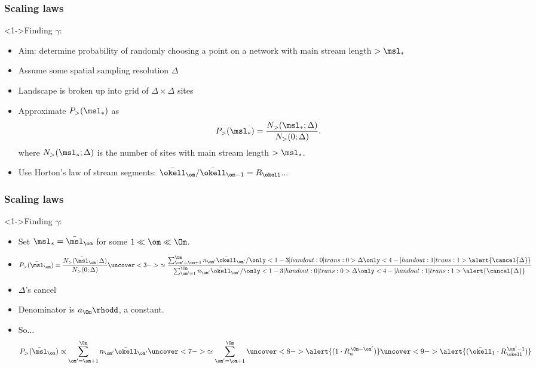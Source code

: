 \begin{frame}[label=]
  \frametitle{Scaling laws}

  \begin{block}<1->{Finding $\gamma$:}
    \begin{itemize}
    \item<1-> \alert{Aim:} determine probability of randomly choosing
      a point on a network with main stream length $> \msl_\ast$
    \item<2-> Assume some spatial sampling resolution $\Delta$
    \item<3-> Landscape is broken up into grid of $\Delta \times \Delta$ sites
    \item<4-> Approximate $P_> (\msl_\ast)$ as 
      $$
      P_> (\msl_\ast)
      =
      \frac
      {N_> (\msl_\ast; \Delta)}
      {N_> (0; \Delta)}.
      $$
      where $N_> (\msl_\ast; \Delta)$ is the number of sites
      with main stream length $> \msl_\ast$.
    \item<5-> Use Horton's law of stream segments: $\bar{\okell}_\om/\bar{\okell}_{\om-1} = R_\okell$...
    \end{itemize}
  \end{block}

\end{frame}

\begin{frame}[label=]
  \frametitle{Scaling laws}

  \begin{block}<1->{Finding $\gamma$:}
    \begin{itemize}
    \item<1-> Set $\msl_\ast = \bar{\msl}_\om$ for some $1 \ll \om \ll \Om$.
    \item<2->
      $$
      P_> (\bar{\msl}_\om)
      =
      \frac
      {N_> (\bar{\msl}_\om; \Delta)}
      {N_> (0; \Delta)}
      \uncover<3->{
        \simeq
        \frac
        {
          \sum_{\om'=\om+1}^{\Om} n_{\om'}
          \bar{\okell}_{\om'}/\only<1-3 | handout:0 | trans:0>{\Delta}\only<4- | handout:1 | trans:1>{\alert{\cancel{\Delta}}}
        }
        {
          \sum_{\om'=1}^{\Om} n_{\om'} \bar{\okell}_{\om'}/\only<1-3 | handout:0 | trans:0>{\Delta}\only<4- | handout:1 | trans:1>{\alert{\cancel{\Delta}}}
        }
      }
      $$
    \item<4->
      $\Delta$'s cancel
    \item<5-> 
      Denominator is $a_\Om \rhodd$, a constant.
    \item<6->
      So...  
      $$
      P_> (\bar{\msl}_\om)
      \propto
      \sum_{\om'=\om+1}^{\Om} n_{\om'} \bar{\okell}_{\om'}
      \uncover<7->{
        \simeq
        \sum_{\om'=\om+1}^{\Om} 
        \uncover<8->{\alert{(1\cdot R_n^{\, \Om-\om'})}}
        \uncover<9->{\alert{(\bar{\okell}_{1} \cdot R_\okell^{\, \om'-1})}}
      }
      $$
    \end{itemize}
  \end{block}

\end{frame}

